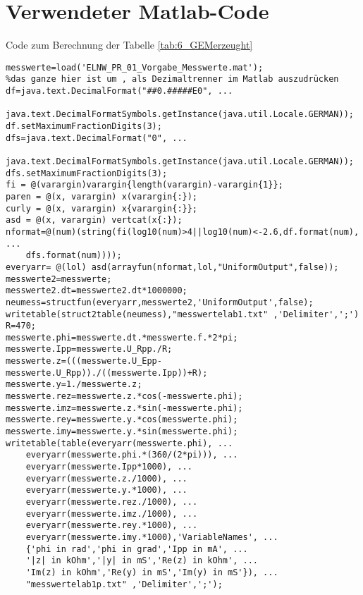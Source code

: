 %
\section{Verwendeter Matlab-Code}
\label{app:Matlab}
%
Code zum Berechnung der Tabelle \ref{tab:6_GEMerzeught}
\begin{verbatim}
messwerte=load('ELNW_PR_01_Vorgabe_Messwerte.mat');
%das ganze hier ist um , als Dezimaltrenner im Matlab auszudrücken
df=java.text.DecimalFormat("##0.#####E0", ...
    java.text.DecimalFormatSymbols.getInstance(java.util.Locale.GERMAN));
df.setMaximumFractionDigits(3);
dfs=java.text.DecimalFormat("0", ...
    java.text.DecimalFormatSymbols.getInstance(java.util.Locale.GERMAN));
dfs.setMaximumFractionDigits(3);
fi = @(varargin)varargin{length(varargin)-varargin{1}};
paren = @(x, varargin) x(varargin{:});
curly = @(x, varargin) x{varargin{:}};
asd = @(x, varargin) vertcat(x{:});
nformat=@(num)(string(fi(log10(num)>4||log10(num)<-2.6,df.format(num), ...
    dfs.format(num))));
everyarr= @(lol) asd(arrayfun(nformat,lol,"UniformOutput",false));
messwerte2=messwerte;
messwerte2.dt=messwerte2.dt*1000000;
neumess=structfun(everyarr,messwerte2,'UniformOutput',false);
writetable(struct2table(neumess),"messwertelab1.txt" ,'Delimiter',';')
R=470;
messwerte.phi=messwerte.dt.*messwerte.f.*2*pi;
messwerte.Ipp=messwerte.U_Rpp./R;
messwerte.z=(((messwerte.U_Epp-messwerte.U_Rpp))./((messwerte.Ipp))+R);
messwerte.y=1./messwerte.z;
messwerte.rez=messwerte.z.*cos(-messwerte.phi);
messwerte.imz=messwerte.z.*sin(-messwerte.phi);
messwerte.rey=messwerte.y.*cos(messwerte.phi);
messwerte.imy=messwerte.y.*sin(messwerte.phi);
writetable(table(everyarr(messwerte.phi), ...
    everyarr(messwerte.phi.*(360/(2*pi))), ...
    everyarr(messwerte.Ipp*1000), ...
    everyarr(messwerte.z./1000), ...
    everyarr(messwerte.y.*1000), ...
    everyarr(messwerte.rez./1000), ...
    everyarr(messwerte.imz./1000), ...
    everyarr(messwerte.rey.*1000), ...
    everyarr(messwerte.imy.*1000),'VariableNames', ...
    {'phi in rad','phi in grad','Ipp in mA', ...
    '|z| in kOhm','|y| in mS','Re(z) in kOhm', ...
    'Im(z) in kOhm','Re(y) in mS','Im(y) in mS'}), ...
    "messwertelab1p.txt" ,'Delimiter',';');
\end{verbatim}

